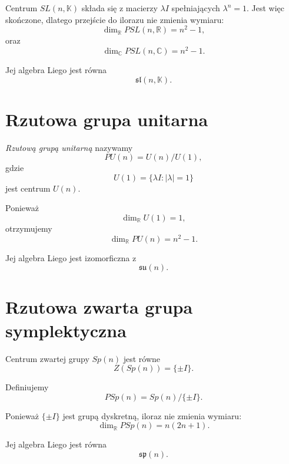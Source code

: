 Centrum $SL(n,\mathbb K)$ składa się z macierzy
$\lambda I$ spełniających $\lambda^n=1$.
Jest więc skończone, dlatego przejście do
ilorazu nie zmienia wymiaru:
\[
\dim_{\mathbb R}PSL(n,\mathbb R)=n^2-1,
\]
oraz
\[
\dim_{\mathbb C}PSL(n,\mathbb C)=n^2-1.
\]

Jej algebra Liego jest równa
\[
\mathfrak{sl}(n,\mathbb K).
\]



\section{Rzutowa grupa unitarna}


\begin{definicja}
\emph{Rzutową grupą unitarną} nazywamy
\[
PU(n)
=
U(n)/U(1),
\]
gdzie
\[
U(1)=\{\lambda I:|\lambda|=1\}
\]
jest centrum $U(n)$.
\end{definicja}

Ponieważ
\[
\dim_{\mathbb R}U(1)=1,
\]
otrzymujemy
\[
\boxed{
\dim_{\mathbb R}PU(n)=n^2-1.
}
\]

Jej algebra Liego jest izomorficzna z
\[
\mathfrak{su}(n).
\]



\section{Rzutowa zwarta grupa symplektyczna}


Centrum zwartej grupy $Sp(n)$ jest równe
\[
Z(Sp(n))=\{\pm I\}.
\]

\begin{definicja}
Definiujemy
\[
PSp(n)
=
Sp(n)/\{\pm I\}.
\]
\end{definicja}

Ponieważ $\{\pm I\}$ jest grupą dyskretną,
iloraz nie zmienia wymiaru:
\[
\boxed{
\dim_{\mathbb R}PSp(n)
=
n(2n+1).
}
\]

Jej algebra Liego jest równa
\[
\mathfrak{sp}(n).
\]



